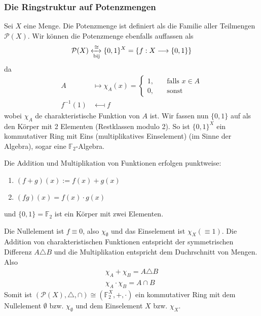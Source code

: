 \subsubsection{Die Ringstruktur auf Potenzmengen}
Sei $X$ eine Menge. Die Potenzmenge ist definiert als die Familie aller Teilmengen $\mathcal{P}(X)$. Wir können die Potenzmenge ebenfalls auffassen als
\begin{equation*}
\mathcal{P}(X) \xleftrightarrow[\text{bij}]{\cong} \{0,1\}^X = \{f:X \longrightarrow \{0,1\}\}
\end{equation*}
da
\begin{align*}
A &\longmapsto \chi_A(x) = \begin{cases}
1, \quad & \text{falls } x\in A\\
0, \quad & \text{sonst}
\end{cases}\\
f^{-1}(1) & \longmapsfrom f
\end{align*}
wobei $\chi_A$ de charakteristische Funktion von $A$ ist. \newline \newline
Wir fassen nun $\{0,1\}$ auf als den Körper mit 2 Elementen (Restklassen modulo 2). So ist $\{0,1\}^X$ ein kommutativer Ring mit Eins (multiplikatives Einselement) (im Sinne der Algebra), sogar eine $\mathbb{F}_2$-Algebra.
\begin{remark} Die Addition und Multiplikation von Funktionen erfolgen punktweise:
\begin{enumerate} [-, itemsep=0pt,topsep=3pt]
\item  $(f+g)(x) := f(x)+g(x)$ 
\item $(fg)(x)= f(x) \cdot g(x)$
\end{enumerate}
und $\{0,1\} = \mathbb{F}_2$ ist ein Körper mit zwei Elementen.
\end{remark}
Die Nullelement ist $f \equiv 0$, also $\chi_\emptyset$ und das Einselement ist $\chi_X (\equiv 1)$. Die Addition von charakteristischen Funktionen entspricht der symmetrischen Differenz $A \triangle B$ und die Multiplikation entspricht dem Duchrschnitt von Mengen. Also
\begin{align*}
\chi_A + \chi_B = A \triangle B \\
\chi_A \cdot \chi_B = A \cap B
\end{align*}
Somit ist $(\mathcal{P}(X), \triangle, \cap) \cong (\mathbb{F}_2^X, +, \cdot)$ ein kommutativer Ring mit dem Nullelement $\emptyset$ bzw. $\chi_\emptyset$ und dem Einselement $X$ bzw. $\chi_X$. 

